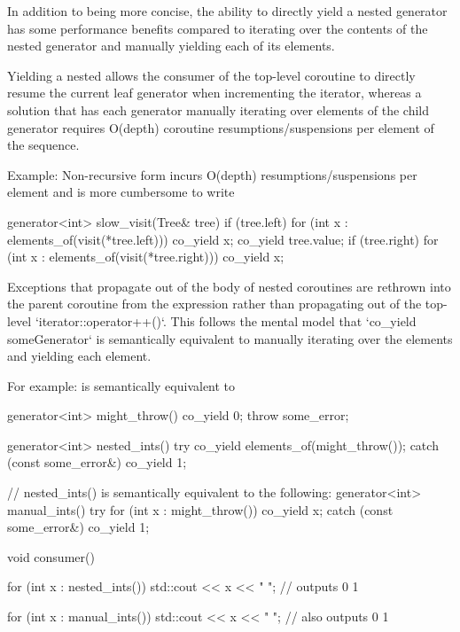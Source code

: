 \documentclass{wg21}
\begin{document}
In addition to being more concise, the ability to directly yield a nested generator has some
performance benefits compared to iterating over the contents of the nested generator and
manually yielding each of its elements.

Yielding a nested  allows the consumer of the top-level coroutine to
directly resume the current leaf generator when incrementing the iterator, whereas a solution that has each generator manually iterating over elements of the child generator
requires O(depth) coroutine resumptions/suspensions per element of the sequence.

Example: Non-recursive form incurs O(depth) resumptions/suspensions per element
and is more cumbersome to write

\begin{colorblock}
    generator<int> slow_visit(Tree& tree) {
        if (tree.left) {
            for (int x : elements_of(visit(*tree.left)))
            co_yield x;
        }
        co_yield tree.value;
        if (tree.right) {
            for (int x : elements_of(visit(*tree.right)))
            co_yield x;
        }
    }
\end{colorblock}

Exceptions that propagate out of the body of nested  coroutines
are rethrown into the parent coroutine from the  expression rather
than propagating out of the top-level `iterator::operator++()`. This follows the mental model that `co_yield someGenerator` is semantically equivalent to manually
iterating over the elements and yielding each element.

For example:  is semantically equivalent to 
\begin{colorblock}
    generator<int> might_throw() {
        co_yield 0;
        throw some_error{};
    }
    
    generator<int> nested_ints() {
        try {
            co_yield elements_of(might_throw());
        } catch (const some_error&) {}
        co_yield 1;
    }
    
    // nested_ints() is semantically equivalent to the following:
    generator<int> manual_ints() {
        try {
            for (int x : might_throw()) {
                co_yield x;
            }
        } catch (const some_error&) {}
        co_yield 1;
    }
    
    void consumer() {
        for (int x : nested_ints()) {
            std::cout << x << " "; // outputs 0 1
        }
        
        for (int x : manual_ints()) {
            std::cout << x << " "; // also outputs 0 1
        }
    }
\end{colorblock}
\end{document}
